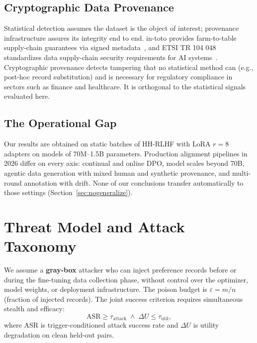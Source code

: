 \documentclass[runningheads]{llncs}
\begin{document}
\subsection{Cryptographic Data Provenance}\label{sec:provenance}

Statistical detection assumes the dataset is the object of interest;
provenance infrastructure assures its integrity end to end. in-toto provides
farm-to-table supply-chain guarantees via signed
metadata~\cite{torresarias2019intoto}, and ETSI TR 104 048 standardizes data
supply-chain security requirements for AI systems~\cite{etsi104048}.
Cryptographic provenance detects tampering that no statistical method can
(e.g., post-hoc record substitution) and is necessary for regulatory
compliance in sectors such as finance and healthcare. It is orthogonal to the
statistical signals evaluated here.

\subsection{The Operational Gap}\label{sec:opgap}

Our results are obtained on static batches of HH-RLHF with LoRA $r{=}8$
adapters on models of 70M--1.5B parameters. Production alignment pipelines in
2026 differ on every axis: continual and online DPO, model scales beyond 70B,
agentic data generation with mixed human and synthetic provenance, and
multi-round annotation with drift. None of our conclusions transfer
automatically to those settings (Section~\ref{sec:nogeneralize}).

\section{Threat Model and Attack Taxonomy}\label{sec:threat}

We assume a \textbf{gray-box} attacker who can inject preference records before
or during the fine-tuning data collection phase, without control over the
optimizer, model weights, or deployment infrastructure. The poison budget is
$\varepsilon = m/n$ (fraction of injected records). The joint success criterion
requires simultaneous stealth and efficacy:
\begin{equation}
  \text{ASR} \geq \tau_{\text{attack}} \;\wedge\; \Delta U \leq \tau_{\text{util}},
\end{equation}
where ASR is trigger-conditioned attack success rate and $\Delta U$ is utility
degradation on clean held-out pairs.
\end{document}
